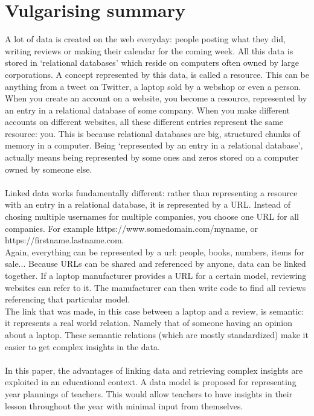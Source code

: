 \chapter*{Vulgarising summary}
\noindent A lot of data is created on the web everyday: people posting what they did, writing reviews or making their calendar for the coming week.
All this data is stored in `relational databases' which reside on computers often owned by large corporations.
A concept represented by this data, is called a resource. This can be anything from a tweet on Twitter, a laptop sold by a webshop or even a person.
When you create an account on a website, you become a resource, represented by an entry in a relational database of some company.
When you make different accounts on different websites, all these different entries represent the same resource: you.
This is because relational databases are big, structured chunks of memory in a computer.
Being `represented by an entry in a relational database', actually means being represented by some ones and zeros stored on a computer owned by someone else.\\ \\
Linked data works fundamentally different: rather than representing a resource with an entry in a relational database, it is represented by a URL.
Instead of chosing multiple usernames for multiple companies, you choose one URL for all companies. For example https://www.somedomain.com/myname, or https://firstname.lastname.com.\\
Again, everything can be represented by a url: people, books, numbers, items for sale...
Because URLs can be shared and referenced by anyone, data can be linked together.
If a laptop manufacturer provides a URL for a certain model, reviewing websites can refer to it.
The manufacturer can then write code to find all reviews referencing that particular model.\\
The link that was made, in this case between a laptop and a review, is semantic: it represents a real world relation. Namely that of someone having an opinion about a laptop.
These semantic relations (which are mostly standardized) make it easier to get complex insights in the data.\\ \\
In this paper, the advantages of linking data and retrieving complex insights are exploited in an educational context.
A data model is proposed for representing year plannings of teachers.
This would allow teachers to have insights in their lesson throughout the year with minimal input from themselves.
